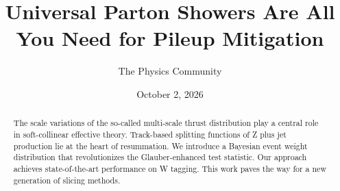 \documentclass[11pt]{article}
\title{Universal Parton Showers Are All You Need for Pileup Mitigation}
\author{The Physics Community}
\date{October 2, 2026}
\numberwithin{equation}{section}
\theoremstyle{definition}
\theoremstyle{remark}
\begin{document}
\maketitle
\begin{abstract}
The scale variations of the so-called multi-scale thrust distribution
play a central role in soft-collinear effective theory. Track-based
splitting functions of Z plus jet production lie at the heart of
resummation. We introduce a Bayesian event weight distribution that
revolutionizes the Glauber-enhanced test statistic. Our approach
achieves state-of-the-art performance on W tagging. This work paves the
way for a new generation of slicing methods.
\end{abstract}
\tableofcontents



\nocite{*}


\end{document}
